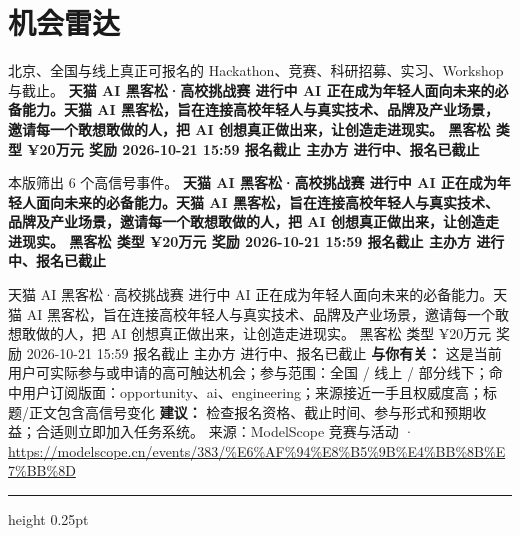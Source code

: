 \documentclass[10.5pt]{ctexart}
\begin{document}
\section*{机会雷达}
{\color{ormuted} 北京、全国与线上真正可报名的 Hackathon、竞赛、科研招募、实习、Workshop 与截止。}
\vspace{2mm}
{\LARGE\bfseries 天猫 AI 黑客松·高校挑战赛 进行中 AI 正在成为年轻人面向未来的必备能力。天猫 AI 黑客松，旨在连接高校年轻人与真实技术、品牌及产业场景，邀请每一个敢想敢做的人，把 AI 创想真正做出来，让创造走进现实。 黑客松 类型 ¥20万元 奖励 2026-10-21 15:59 报名截止 主办方 进行中、报名已截止}\par
\vspace{1mm}
{\color{ormuted} 本版筛出 6 个高信号事件。}
\vspace{3mm}
{\Large\bfseries 天猫 AI 黑客松·高校挑战赛 进行中 AI 正在成为年轻人面向未来的必备能力。天猫 AI 黑客松，旨在连接高校年轻人与真实技术、品牌及产业场景，邀请每一个敢想敢做的人，把 AI 创想真正做出来，让创造走进现实。 黑客松 类型 ¥20万元 奖励 2026-10-21 15:59 报名截止 主办方 进行中、报名已截止}\par
天猫 AI 黑客松·高校挑战赛 进行中 AI 正在成为年轻人面向未来的必备能力。天猫 AI 黑客松，旨在连接高校年轻人与真实技术、品牌及产业场景，邀请每一个敢想敢做的人，把 AI 创想真正做出来，让创造走进现实。 黑客松 类型 ¥20万元 奖励 2026-10-21 15:59 报名截止 主办方 进行中、报名已截止
\textbf{与你有关：} 这是当前用户可实际参与或申请的高可触达机会；参与范围：全国 / 线上 / 部分线下；命中用户订阅版面：opportunity、ai、engineering；来源接近一手且权威度高；标题/正文包含高信号变化
\textbf{建议：} 检查报名资格、截止时间、参与形式和预期收益；合适则立即加入任务系统。
{\footnotesize\color{ormuted} 来源：ModelScope 竞赛与活动 · \url{https://modelscope.cn/events/383/%E6%AF%94%E8%B5%9B%E4%BB%8B%E7%BB%8D}}
\vspace{4mm}
\hrule height 0.25pt
\vspace{3mm}
\end{document}

